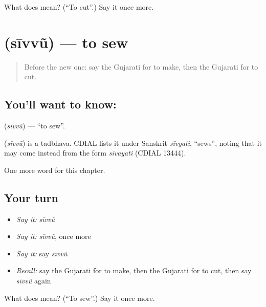 \begin{tcolorbox}[breakable,colback=teal!4,colframe=teal!35!black,title={Before you move on}]
What does  mean? (\textquotedblleft{}To cut\textquotedblright{}.) Say it once more.
\end{tcolorbox}
\section[\texorpdfstring{\gu{સીવવું} (sīvvũ)}{સીવવું (sīvvũ)}]{ (sīvvũ) — to sew}

\label{lesson:GU-C140-sivvu}



\begin{quote}
Before the new one: say the Gujarati for to make, then the Gujarati for to cut.
\end{quote}

\subsection*{You'll want to know: }
\textbf{} (\emph{sīvvũ}) — \textquotedblleft{}to sew\textquotedblright{}.

\begin{cousinweb}
\textbf{} (\emph{sīvvũ}) is a tadbhava. CDIAL lists it under Sanskrit \emph{sīvyati}, \textquotedblleft{}sews\textquotedblright{}, noting that it may come instead from the form \emph{sīvayati} (CDIAL 13444).
\end{cousinweb}

\begin{grammarlens}[title={What you've built}]
One more word for this chapter.
\end{grammarlens}

\subsection*{Your turn}
\begin{itemize}
\raggedright
  \item \emph{Say it:} \emph{sīvvũ}
  \item \emph{Say it:} \emph{sīvvũ}, once more
  \item \emph{Say it:} say \emph{sīvvũ}
  \item \emph{Recall:} say the Gujarati for to make, then the Gujarati for to cut, then say \emph{sīvvũ} again
\end{itemize}

\begin{tcolorbox}[breakable,colback=teal!4,colframe=teal!35!black,title={Before you move on}]
What does  mean? (\textquotedblleft{}To sew\textquotedblright{}.) Say it once more.
\end{tcolorbox}
